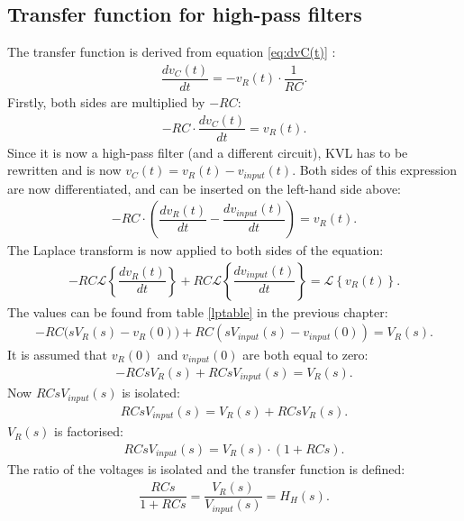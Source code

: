 \subsection{Transfer function for high-pass filters}
The transfer function is derived from equation \eqref{eq:dvC(t)} :
\begin{align*}
\dfrac{dv_{C}(t)}{dt} = -v_{R}(t) \cdot \dfrac{1}{RC}.
\end{align*}
Firstly, both sides are multiplied by $-RC$:
\begin{align*}
-RC \cdot \dfrac{dv_{C}(t)}{dt} = v_{R}(t).
\end{align*}
Since it is now a high-pass filter (and a different circuit), KVL has to be rewritten and is now $v_{C}(t)=v_{R}(t)-v_{input}(t)$. Both sides of this expression are now differentiated, and can be inserted on the left-hand side above:
\begin{align*}
-RC \cdot \left(\dfrac{dv_{R}(t)}{dt} - \dfrac{dv_{input}(t)}{dt} \right) = v_{R}(t).
\end{align*}
The Laplace transform is now applied to both sides of the equation:
\begin{align*}
-RC \mathcal{L} \left\{\dfrac{dv_{R}(t)}{dt} \right\} + RC \mathcal{L} \left\{ \dfrac{dv_{input}(t)}{dt} \right\} = \mathcal{L} \left\{v_{R}(t) \right\}.
\end{align*}
The values can be found from table \ref{lptable} in the previous chapter:
\begin{align*}
-RC \big(sV_{R}(s)-v_{R}(0)\big) + RC \left(sV_{input}(s)-v_{input}(0)\right) = V_{R}(s).
\end{align*}
It is assumed that $v_{R}(0)$ and $v_{input}(0)$ are both equal to zero:
\begin{align*}
-RCsV_{R}(s) + RCsV_{input}(s) = V_{R}(s).
\end{align*}
Now $RCs V_{input}(s)$ is isolated:
\begin{align*}
RCsV_{input}(s) = V_{R}(s) + RCsV_{R}(s).
\end{align*}
$V_{R}(s)$ is factorised:
\begin{align*}
RCsV_{input}(s) = V_{R}(s) \cdot (1 + RCs).
\end{align*}
The ratio of the voltages is isolated and the transfer function is defined:
\begin{align} \label{hp:visolated}
\dfrac{RCs}{1 + RCs} = \dfrac{V_{R}(s)}{V_{input}(s)} = H_H(s).
\end{align}
